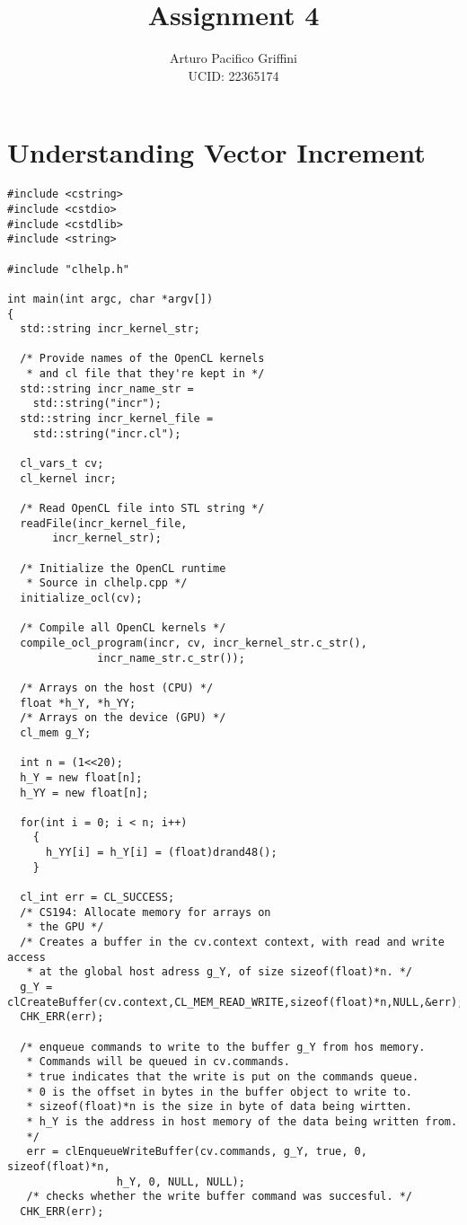 \documentclass[11pt,letter]{article}
\title{Assignment 4}
\author{Arturo Pacifico Griffini\\
  UCID: 22365174}
\date{}
\begin{document}
%

\pagebreak



\section{Understanding Vector Increment}

\begin{lstlisting}[label=some-code,caption=incr.cpp ]
#include <cstring>
#include <cstdio>
#include <cstdlib>
#include <string>

#include "clhelp.h"

int main(int argc, char *argv[])
{
  std::string incr_kernel_str;

  /* Provide names of the OpenCL kernels
   * and cl file that they're kept in */
  std::string incr_name_str =
    std::string("incr");
  std::string incr_kernel_file =
    std::string("incr.cl");

  cl_vars_t cv;
  cl_kernel incr;

  /* Read OpenCL file into STL string */
  readFile(incr_kernel_file,
	   incr_kernel_str);

  /* Initialize the OpenCL runtime
   * Source in clhelp.cpp */
  initialize_ocl(cv);

  /* Compile all OpenCL kernels */
  compile_ocl_program(incr, cv, incr_kernel_str.c_str(),
		      incr_name_str.c_str());

  /* Arrays on the host (CPU) */
  float *h_Y, *h_YY;
  /* Arrays on the device (GPU) */
  cl_mem g_Y;

  int n = (1<<20);
  h_Y = new float[n];
  h_YY = new float[n];

  for(int i = 0; i < n; i++)
    {
      h_YY[i] = h_Y[i] = (float)drand48();
    }

  cl_int err = CL_SUCCESS;
  /* CS194: Allocate memory for arrays on
   * the GPU */
  /* Creates a buffer in the cv.context context, with read and write access
   * at the global host adress g_Y, of size sizeof(float)*n. */
  g_Y = clCreateBuffer(cv.context,CL_MEM_READ_WRITE,sizeof(float)*n,NULL,&err);
  CHK_ERR(err);

  /* enqueue commands to write to the buffer g_Y from hos memory.
   * Commands will be queued in cv.commands.
   * true indicates that the write is put on the commands queue.
   * 0 is the offset in bytes in the buffer object to write to.
   * sizeof(float)*n is the size in byte of data being wirtten.
   * h_Y is the address in host memory of the data being written from.
   */
   err = clEnqueueWriteBuffer(cv.commands, g_Y, true, 0, sizeof(float)*n,
			     h_Y, 0, NULL, NULL);
   /* checks whether the write buffer command was succesful. */
  CHK_ERR(err);


\end{lstlisting}
\end{document}
